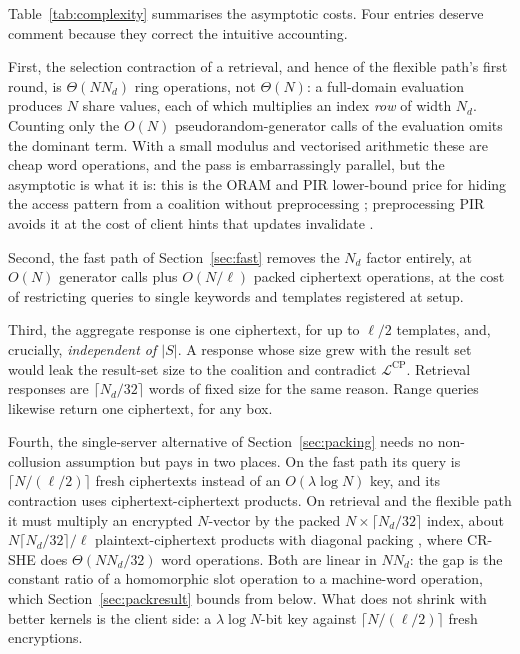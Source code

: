 \documentclass[a4paper,fleqn]{cas-sc}
\newcommand{\Leak}{\mathcal{L}}
\begin{document}
Table~\ref{tab:complexity} summarises the asymptotic costs. Four entries
deserve comment because they correct the intuitive accounting.

First, the selection contraction of a retrieval, and hence of the flexible
path's first round, is $\Theta(N N_d)$ ring
operations, not $\Theta(N)$: a full-domain evaluation produces $N$ share
values, each of which multiplies an index \emph{row} of width $N_d$. Counting
only the $O(N)$ pseudorandom-generator calls of the evaluation omits the
dominant term. With a small modulus and vectorised arithmetic these are cheap
word operations, and the pass is embarrassingly parallel, but the asymptotic
is what it is: this is the ORAM and PIR lower-bound price for hiding the
access pattern from a coalition without preprocessing
\citep{goldreich1996software,beimel2000reducing}; preprocessing PIR avoids it
at the cost of client hints that updates invalidate
\citep{corrigan2020private}.

Second, the fast path of Section~\ref{sec:fast} removes the $N_d$ factor
entirely, at $O(N)$ generator calls plus $O(N/\ell)$ packed ciphertext
operations, at the cost of restricting queries to single keywords and
templates registered at setup.

Third, the aggregate response is one ciphertext, for up to $\ell/2$ templates,
and, crucially, \emph{independent of $|S|$}. A response whose size grew with the result set
would leak the result-set size to the coalition and contradict
$\Leak^{\text{CP}}$. Retrieval responses are $\lceil N_d/32\rceil$ words of
fixed size for the same reason. Range queries likewise return one ciphertext,
for any box.

Fourth, the single-server alternative of Section~\ref{sec:packing} needs no
non-collusion assumption but pays in two places. On the fast path its query is
$\lceil N/(\ell/2)\rceil$ fresh ciphertexts instead of an $O(\lambda\log N)$
key, and its contraction uses ciphertext-ciphertext products. On retrieval and
the flexible path it must multiply an encrypted $N$-vector by the packed
$N\times\lceil N_d/32\rceil$ index, about $N\lceil N_d/32\rceil/\ell$
plaintext-ciphertext products with diagonal packing
\citep{halevi2014algorithms}, where CR-SHE does $\Theta(NN_d/32)$ word
operations. Both are linear in $NN_d$: the gap is the constant ratio of a
homomorphic slot operation to a machine-word operation, which
Section~\ref{sec:packresult} bounds from below. What does not shrink with
better kernels is the client side: a $\lambda\log N$-bit key against
$\lceil N/(\ell/2)\rceil$ fresh encryptions.
\end{document}
